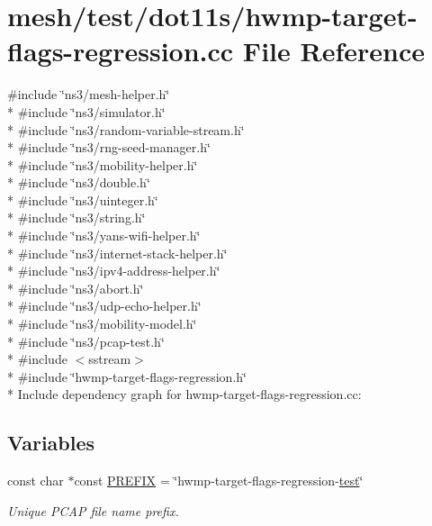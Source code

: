 \hypertarget{hwmp-target-flags-regression_8cc}{}\section{mesh/test/dot11s/hwmp-\/target-\/flags-\/regression.cc File Reference}
\label{hwmp-target-flags-regression_8cc}
{\ttfamily \#include \char`\"{}ns3/mesh-\/helper.\+h\char`\"{}}\\*
{\ttfamily \#include \char`\"{}ns3/simulator.\+h\char`\"{}}\\*
{\ttfamily \#include \char`\"{}ns3/random-\/variable-\/stream.\+h\char`\"{}}\\*
{\ttfamily \#include \char`\"{}ns3/rng-\/seed-\/manager.\+h\char`\"{}}\\*
{\ttfamily \#include \char`\"{}ns3/mobility-\/helper.\+h\char`\"{}}\\*
{\ttfamily \#include \char`\"{}ns3/double.\+h\char`\"{}}\\*
{\ttfamily \#include \char`\"{}ns3/uinteger.\+h\char`\"{}}\\*
{\ttfamily \#include \char`\"{}ns3/string.\+h\char`\"{}}\\*
{\ttfamily \#include \char`\"{}ns3/yans-\/wifi-\/helper.\+h\char`\"{}}\\*
{\ttfamily \#include \char`\"{}ns3/internet-\/stack-\/helper.\+h\char`\"{}}\\*
{\ttfamily \#include \char`\"{}ns3/ipv4-\/address-\/helper.\+h\char`\"{}}\\*
{\ttfamily \#include \char`\"{}ns3/abort.\+h\char`\"{}}\\*
{\ttfamily \#include \char`\"{}ns3/udp-\/echo-\/helper.\+h\char`\"{}}\\*
{\ttfamily \#include \char`\"{}ns3/mobility-\/model.\+h\char`\"{}}\\*
{\ttfamily \#include \char`\"{}ns3/pcap-\/test.\+h\char`\"{}}\\*
{\ttfamily \#include $<$sstream$>$}\\*
{\ttfamily \#include \char`\"{}hwmp-\/target-\/flags-\/regression.\+h\char`\"{}}\\*
Include dependency graph for hwmp-\/target-\/flags-\/regression.cc\+:
\subsection*{Variables}
\begin{DoxyCompactItemize}
\item 
const char $\ast$const \hyperlink{hwmp-target-flags-regression_8cc_a61dc66981fa47bfd0066a57a487c599c}{P\+R\+E\+F\+IX} = \char`\"{}hwmp-\/target-\/flags-\/regression-\/\hyperlink{main-test-sync_8cc_a708a4c1a4d0c4acc4c447310dd4db27f}{test}\char`\"{}
\begin{DoxyCompactList}\small\item\em Unique P\+C\+AP file name prefix. \end{DoxyCompactList}\end{DoxyCompactItemize}


